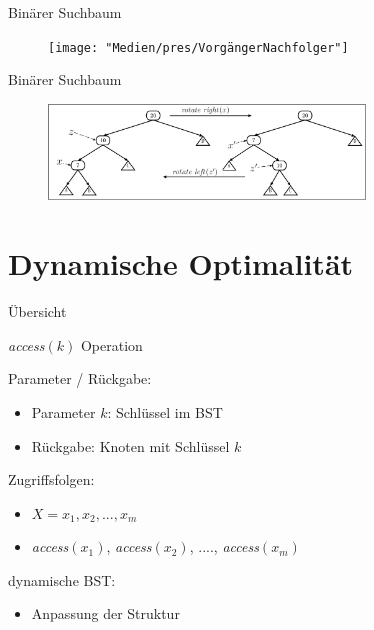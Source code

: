 \documentclass[11pt]{beamer}
\begin{document}
			\begin{frame} {Binärer Suchbaum}
			\begin{figure}[h]
				\centering
				\texttt{[image: "Medien/pres/VorgängerNachfolger"]}
			\end{figure}    
		\end{frame}
	
	\begin{frame} {Binärer Suchbaum}
			\begin{figure}[h]
				\centering
				\includegraphics[width=0.75\textwidth]{"Medien/pres/LinksRechtsRotation"}
			\end{figure}    
		\end{frame}	
	
	\section{Dynamische Optimalität}
	
		\begin{frame} {Übersicht}
			\tableofcontents[currentsection]   
		\end{frame}
	
	   
    
    
  \begin{frame} {	\textit{access}$\left(k\right)$ Operation}
    \begin{block}{Parameter / Rückgabe:}
    	\begin{itemize}
    		\item Parameter $k$: Schlüssel im BST 
    		\item Rückgabe: Knoten mit Schlüssel $k$
      \end{itemize}
    			
    \end{block}	
    \pause
    \begin{block}{Zugriffsfolgen:}
    	\begin{itemize}
    		\item   $X = x_1, x_2,..., x_m$ 
    		\item  \textit{access}$\left(x_1\right)$,   \textit{access}$\left(x_2\right)$, ....,  
    		\textit{access}$\left(x_m\right)$  
    	\end{itemize}
    \end{block}			
	\pause
   \begin{block}{dynamische BST:}
	 \begin{itemize}
		\item Anpassung der Struktur 	 
 	\end{itemize}
   \end{block}			
\end{frame}	    
    
\end{document}
